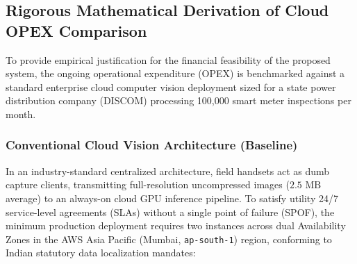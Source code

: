 \documentclass[12pt,a4paper,oneside]{report}
\begin{document}
\subsection{Rigorous Mathematical Derivation of Cloud OPEX Comparison}
To provide empirical justification for the financial feasibility of the proposed system, the ongoing operational expenditure (OPEX) is benchmarked against a standard enterprise cloud computer vision deployment sized for a state power distribution company (DISCOM) processing 100,000 smart meter inspections per month.

\subsubsection{Conventional Cloud Vision Architecture (Baseline)}
In an industry-standard centralized architecture, field handsets act as dumb capture clients, transmitting full-resolution uncompressed images ($2.5\text{~MB}$ average) to an always-on cloud GPU inference pipeline. To satisfy utility 24/7 service-level agreements (SLAs) without a single point of failure (SPOF), the minimum production deployment requires two instances across dual Availability Zones in the AWS Asia Pacific (Mumbai, \texttt{ap-south-1}) region, conforming to Indian statutory data localization mandates:
\end{document}
